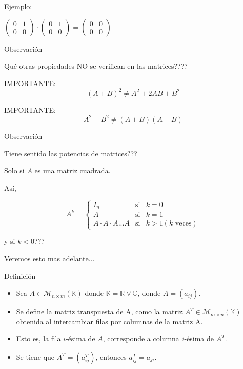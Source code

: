 Ejemplo:

$ \left(
\begin{array}{ccc}
0  & 1 \\
0  & 0
\end{array}
\right)
\cdot
\left(
\begin{array}{ccc}
0  & 1 \\
0  & 0
\end{array}
\right)
=\left(
\begin{array}{ccc}
0  & 0 \\
0  & 0
\end{array}
\right)
$


{Observación }

Qué otras propiedades  NO se verifican en las matrices????

\begin{alertblock}{IMPORTANTE:}
$$(A+B)^2 \neq  A^2 + 2AB +B^2$$
\end{alertblock}

\begin{alertblock}{IMPORTANTE:}
$$A^2  - B^2 \neq  (A+B)(A-B)$$
\end{alertblock}


{Observación }

Tiene sentido las potencias de matrices???

Solo si $A$ es una matriz cuadrada.

Así, 

$$A^k =
 \left\{ \begin{array}{lcl}
I_n & \mbox{si} & k=0 \\ 
A & \mbox{si} & k=1 \\ 
A\cdot A  \cdot A ... A & \mbox{si} & k>1 (k \mbox{  veces}) 
\end{array}\right.
$$

y si $ k<0$???


Veremos esto mas adelante...


{Definición}

\begin{itemize}
\item
Sea $A \in \mathcal{M}_{n\times m}(\mathbb{K})$  donde $\mathbb{K} = \mathbb{R}  \vee \mathbb{C}$, donde  $A=(a_{ij}).$

\item
Se define la matriz transpuesta de A, como la matriz $A^T \in \mathcal{M}_{m\times n}(\mathbb{K})$ obtenida al intercambiar filas por columnas de la matriz A.

\item
Esto es, la fila $i$-ésima de $A$, corresponde a columna $i$-ésima de $A^T$.

\item
Se tiene que $A^T=(a_{ij}^T)$, entonces $a_{ij}^T= a_{ji}$.

\end{itemize}


